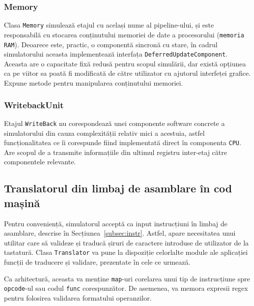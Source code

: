 \documentclass{article}
\begin{document}
\subsubsection{Memory}
Clasa \texttt{Memory} simulează etajul cu același nume al pipeline-ului, și este responsabilă cu stocarea conținutului memoriei de date a procesorului (\texttt{memoria RAM}). Deoarece este, practic, o componentă sincronă cu stare, în cadrul simulatorului aceasta implementează interfața \texttt{DeferredUpdateComponent}. Aceasta are o capacitate fixă redusă pentru scopul simulării, dar există opțiunea ca pe viitor sa poată fi modificată de către utilizator cu ajutorul interfeței grafice. Expune metode pentru manipularea conținutului memoriei.


\subsubsection{WritebackUnit}
Etajul \texttt{WriteBack} nu corespondează unei componente software concrete a simulatorului din cauza complexității relativ mici a acestuia, astfel funcționalitatea ce îi corespunde fiind implementată direct în componenta \texttt{CPU}. Are scopul de a transmite informațiile din ultimul registru inter-etaj către componentele relevante.

\subsection{Translatorul din limbaj de asamblare în cod mașină}
Pentru conveniență, simulatorul acceptă ca input instrucțiuni în limbaj de asamblare, descrise în Secțiunea~\ref{subsec:instr}. Astfel, apare necesitatea unui utilitar care să valideze și traducă șiruri de caractere introduse de utilizator de la tastatură. Clasa \texttt{Translator} va pune la dispoziție celorlalte module ale aplicației funcții de traducere și validare, prezentate în cele ce urmează.


Ca arhitectură, aceasta va menține \texttt{map}-uri corelarea unui tip de instrucțiune spre \texttt{opcode}-ul sau codul \texttt{func} corespunzător. De asemenea, va memora expresii regex pentru folosirea validarea formatului operanzilor.
\end{document}
